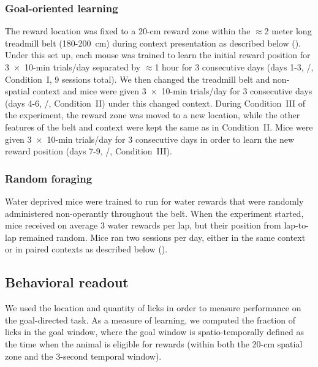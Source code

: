 \subsubsection{Goal-oriented learning}
The reward location was fixed to a 20-cm reward zone within the $\approx$2 meter long treadmill belt (180-200~cm) during context presentation as described below (). Under this set up, each mouse was trained to learn the initial reward position for 3~$\times$~10-min trials/day separated by $\approx$1 hour for 3 consecutive days (days 1-3, \A/, Condition~I, 9 sessions total). We then changed the treadmill belt and non-spatial context and mice were given 3~$\times$~10-min trials/day for 3 consecutive days (days 4-6, \Aprime/, Condition~II) under this changed context. During Condition~III of the experiment, the reward zone was moved to a new location, while the other features of the belt and context were kept the same as in Condition~II. Mice were given 3~$\times$~10-min trials/day for 3 consecutive days in order to learn the new reward position (days 7-9, \Aprime/, Condition~III).
\subsubsection{Random foraging}
Water deprived mice were trained to run for water rewards that were randomly administered non-operantly throughout the belt. When the experiment started, mice received on average 3 water rewards per lap, but their position from lap-to-lap remained random. Mice ran two sessions per day, either in the same context or in paired contexts as described below ().

\subsection{Behavioral readout}
We used the location and quantity of licks in order to measure performance on the goal-directed task. As a measure of learning, we computed the fraction of licks in the goal window, where the goal window is spatio-temporally defined as the time when the animal is eligible for rewards (within both the 20-cm spatial zone and the 3-second temporal window).

